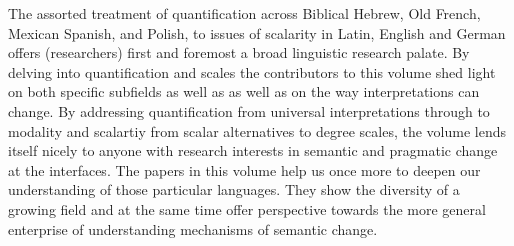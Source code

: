 \documentclass[output=paper]{langsci/langscibook}
\begin{document}
The assorted treatment of quantification across Biblical Hebrew, Old French, Mexican Spanish, and Polish, to issues of scalarity in Latin, English and German offers (researchers) first and foremost a broad linguistic research palate. By delving into quantification and scales the contributors to this volume shed light on both specific subfields as well as as well as on the way interpretations can change.  By addressing quantification from universal interpretations through to modality and scalartiy from scalar alternatives to degree scales, the volume lends itself nicely to anyone with research interests in semantic and pragmatic change at the interfaces. The papers in this volume help us once more to deepen our understanding of those particular languages. They show the diversity of a growing field and at the same time offer perspective towards the more general enterprise of  understanding mechanisms of semantic change.

{\sloppy\printbibliography[heading=subbibliography,notkeyword=this]}
\end{document}
